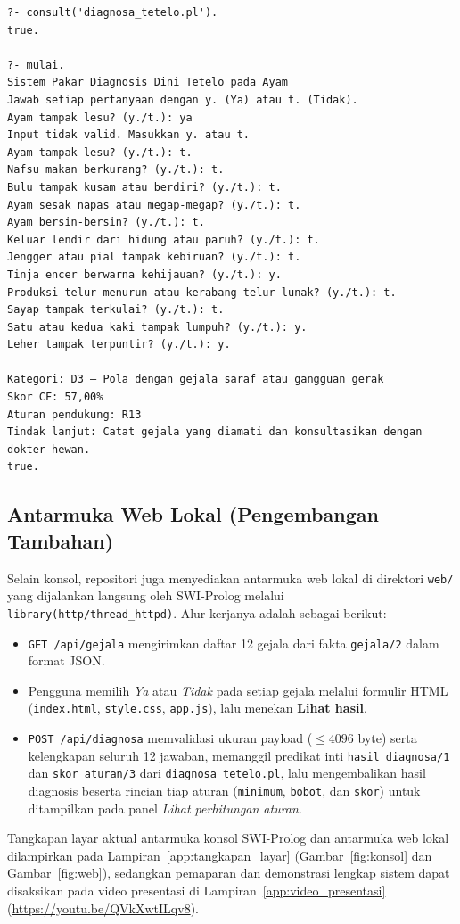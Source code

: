 \documentclass[12pt,a4paper]{report}
\begin{document}
\begin{consolebox}
\begin{verbatim}
?- consult('diagnosa_tetelo.pl').
true.

?- mulai.
Sistem Pakar Diagnosis Dini Tetelo pada Ayam
Jawab setiap pertanyaan dengan y. (Ya) atau t. (Tidak).
Ayam tampak lesu? (y./t.): ya
Input tidak valid. Masukkan y. atau t.
Ayam tampak lesu? (y./t.): t.
Nafsu makan berkurang? (y./t.): t.
Bulu tampak kusam atau berdiri? (y./t.): t.
Ayam sesak napas atau megap-megap? (y./t.): t.
Ayam bersin-bersin? (y./t.): t.
Keluar lendir dari hidung atau paruh? (y./t.): t.
Jengger atau pial tampak kebiruan? (y./t.): t.
Tinja encer berwarna kehijauan? (y./t.): y.
Produksi telur menurun atau kerabang telur lunak? (y./t.): t.
Sayap tampak terkulai? (y./t.): t.
Satu atau kedua kaki tampak lumpuh? (y./t.): y.
Leher tampak terpuntir? (y./t.): y.

Kategori: D3 — Pola dengan gejala saraf atau gangguan gerak
Skor CF: 57,00%
Aturan pendukung: R13
Tindak lanjut: Catat gejala yang diamati dan konsultasikan dengan dokter hewan.
true.
\end{verbatim}
\end{consolebox}

\subsection{Antarmuka Web Lokal (Pengembangan Tambahan)}
Selain konsol, repositori juga menyediakan antarmuka web lokal di direktori \texttt{web/} yang dijalankan langsung oleh SWI-Prolog melalui \texttt{library(http/thread\_httpd)}. Alur kerjanya adalah sebagai berikut:
\begin{itemize}
  \item \texttt{GET /api/gejala} mengirimkan daftar 12 gejala dari fakta \texttt{gejala/2} dalam format JSON.
  \item Pengguna memilih \textit{Ya} atau \textit{Tidak} pada setiap gejala melalui formulir HTML (\texttt{index.html}, \texttt{style.css}, \texttt{app.js}), lalu menekan \textbf{Lihat hasil}.
  \item \texttt{POST /api/diagnosa} memvalidasi ukuran payload ($\le 4096$ byte) serta kelengkapan seluruh 12 jawaban, memanggil predikat inti \texttt{hasil\_diagnosa/1} dan \texttt{skor\_aturan/3} dari \texttt{diagnosa\_tetelo.pl}, lalu mengembalikan hasil diagnosis beserta rincian tiap aturan (\texttt{minimum}, \texttt{bobot}, dan \texttt{skor}) untuk ditampilkan pada panel \textit{Lihat perhitungan aturan}.
\end{itemize}
Tangkapan layar aktual antarmuka konsol SWI-Prolog dan antarmuka web lokal dilampirkan pada Lampiran~\ref{app:tangkapan_layar} (Gambar~\ref{fig:konsol} dan Gambar~\ref{fig:web}), sedangkan pemaparan dan demonstrasi lengkap sistem dapat disaksikan pada video presentasi di Lampiran~\ref{app:video_presentasi} (\url{https://youtu.be/QVkXwtILqv8}).
\end{document}
